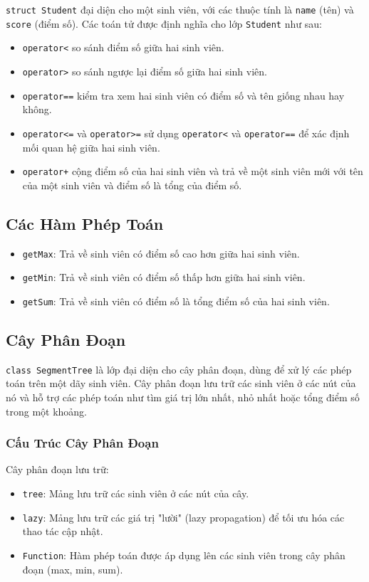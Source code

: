 \documentclass[a4paper]{article}
\begin{document}
\hspace{0.5cm}\texttt{struct Student} đại diện cho một sinh viên, với các thuộc tính là \texttt{name} (tên) và \texttt{score} (điểm số). Các toán tử được định nghĩa cho lớp \texttt{Student} như sau:
\begin{itemize}[label = $\circ$]
  \item \texttt{operator<} so sánh điểm số giữa hai sinh viên.
  \item \texttt{operator>} so sánh ngược lại điểm số giữa hai sinh viên.
  \item \texttt{operator==} kiểm tra xem hai sinh viên có điểm số và tên giống nhau hay không.
  \item \texttt{operator<=} và \texttt{operator>=} sử dụng \texttt{operator<} và \texttt{operator==} để xác định mối quan hệ giữa hai sinh viên.
  \item \texttt{operator+} cộng điểm số của hai sinh viên và trả về một sinh viên mới với tên của một sinh viên và điểm số là tổng của điểm số.
\end{itemize}

\subsection{Các Hàm Phép Toán}

\begin{itemize}[label = $\circ$]
  \item \texttt{getMax}: Trả về sinh viên có điểm số cao hơn giữa hai sinh viên.
  \item \texttt{getMin}: Trả về sinh viên có điểm số thấp hơn giữa hai sinh viên.
  \item \texttt{getSum}: Trả về sinh viên có điểm số là tổng điểm số của hai sinh viên.
\end{itemize}

\subsection{Cây Phân Đoạn}

\hspace{0.5cm}\texttt{class SegmentTree} là lớp đại diện cho cây phân đoạn, dùng để xử lý các phép toán trên một dãy sinh viên. Cây phân đoạn lưu trữ các sinh viên ở các nút của nó và hỗ trợ các phép toán như tìm giá trị lớn nhất, nhỏ nhất hoặc tổng điểm số trong một khoảng. 

\subsubsection{Cấu Trúc Cây Phân Đoạn}
\hspace{0.5cm}Cây phân đoạn lưu trữ:
\begin{itemize}[label = $\circ$]
  \item \texttt{tree}: Mảng lưu trữ các sinh viên ở các nút của cây.
  \item \texttt{lazy}: Mảng lưu trữ các giá trị "lười" (lazy propagation) để tối ưu hóa các thao tác cập nhật.
  \item \texttt{Function}: Hàm phép toán được áp dụng lên các sinh viên trong cây phân đoạn (max, min, sum).
\end{itemize}
\end{document}
